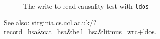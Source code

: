 \documentclass[a4paper]{article}
\begin{document}
\begin{figure}[!h]
\begin{center}
\moveback{}
\end{center}
\caption{The write-to-read causality test with {\tt ldos} \color{red}{(Forbidden)}}
\end{figure}

See also:
\url{virginia.cs.ucl.ac.uk/?record=hsa&cat=hsa&bell=hsa&litmus=wrc+ldos}.
% 
% 
% 
% 
% 
\end{document}
